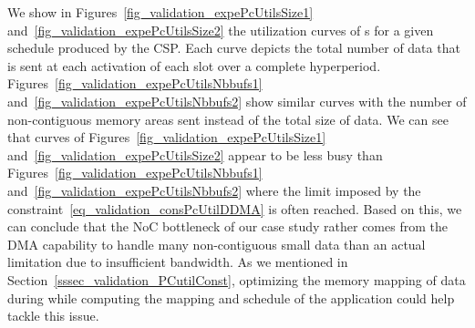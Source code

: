 \documentclass[main.tex]{subfiles}
\begin{document}
We show in Figures~\ref{fig_validation_expePcUtilsSize1}
and~\ref{fig_validation_expePcUtilsSize2} the utilization curves of \PC{}s for
a given schedule produced by the CSP. Each curve depicts the total number of
data that is sent at each activation of each \PC{} slot over a complete
hyperperiod. Figures~\ref{fig_validation_expePcUtilsNbbufs1}
and~\ref{fig_validation_expePcUtilsNbbufs2} show similar curves with the number
of non-contiguous memory areas sent instead of the total size of data. We can
see that curves of Figures~\ref{fig_validation_expePcUtilsSize1}
and~\ref{fig_validation_expePcUtilsSize2} appear to be less busy than
Figures~\ref{fig_validation_expePcUtilsNbbufs1}
and~\ref{fig_validation_expePcUtilsNbbufs2} where the limit imposed by the
constraint~\ref{eq_validation_consPcUtilDDMA} is often reached. Based on this,
we can conclude that the NoC bottleneck of our case study rather comes from the
DMA capability to handle many non-contiguous small data than an actual
limitation due to insufficient bandwidth. As we mentioned in
Section~\ref{sssec_validation_PCutilConst}, optimizing the memory mapping of
data during while computing the mapping and schedule of the application could
help tackle this issue.
\end{document}
